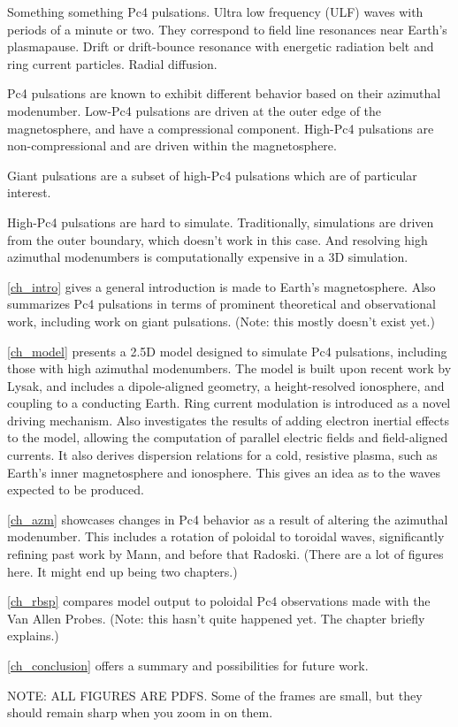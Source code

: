 
Something something Pc4 pulsations. Ultra low frequency (ULF) waves with periods of a minute or two. They correspond to field line resonances near Earth's plasmapause. Drift or drift-bounce resonance with energetic radiation belt and ring current particles. Radial diffusion. 

Pc4 pulsations are known to exhibit different behavior based on their azimuthal modenumber. Low-\azm Pc4 pulsations are driven at the outer edge of the magnetosphere, and have a compressional component. High-\azm Pc4 pulsations are non-compressional and are driven within the magnetosphere. 

Giant pulsations are a subset of high-\azm Pc4 pulsations which are of particular interest. 

High-\azm Pc4 pulsations are hard to simulate. Traditionally, simulations are driven from the outer boundary, which doesn't work in this case. And resolving high azimuthal modenumbers is computationally expensive in a 3D simulation. 

\cref{ch_intro} gives a general introduction is made to Earth's magnetosphere. Also summarizes Pc4 pulsations in terms of prominent theoretical and observational work, including work on giant pulsations. (Note: this mostly doesn't exist yet.) 

\cref{ch_model} presents a 2.5D model designed to simulate Pc4 pulsations, including those with high azimuthal modenumbers. The model is built upon recent work by Lysak, and includes a dipole-aligned geometry, a height-resolved ionosphere, and coupling to a conducting Earth. Ring current modulation is introduced as a novel driving mechanism. Also investigates the results of adding electron inertial effects to the model, allowing the computation of parallel electric fields and field-aligned currents. It also derives dispersion relations for a cold, resistive plasma, such as Earth's inner magnetosphere and ionosphere. This gives an idea as to the waves expected to be produced. 

\cref{ch_azm} showcases changes in Pc4 behavior as a result of altering the azimuthal modenumber. This includes a rotation of poloidal to toroidal waves, significantly refining past work by Mann, and before that Radoski. (There are a lot of figures here. It might end up being two chapters.)

\cref{ch_rbsp} compares model output to poloidal Pc4 observations made with the Van Allen Probes. (Note: this hasn't quite happened yet. The chapter briefly explains.)

\cref{ch_conclusion} offers a summary and possibilities for future work. 

NOTE: ALL FIGURES ARE PDFS. Some of the frames are small, but they should remain sharp when you zoom in on them. 


